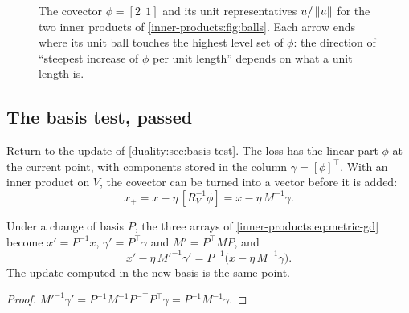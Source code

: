 \begin{notechapter}
\begin{figure}[ht]
\centering
{}
\caption{The covector $\phi = [2\ \ 1]$ and its unit representatives
$u/\left\|u\right\|$ for the two inner products of \cref{inner-products:fig:balls}.
Each arrow ends where its unit ball touches the highest level set of
$\phi$: the direction of ``steepest increase of $\phi$ per unit length''
depends on what a unit length is.}
\label{inner-products:fig:riesz}
\end{figure}

\subsection{The basis test, passed}

Return to the update of \cref{duality:sec:basis-test}. The loss has the
linear part $\phi$ at the current point, with components stored in the
column $\gamma = [\phi]^\top$. With an inner product on $V$, the covector
can be turned into a vector before it is added:
\begin{equation}\label{inner-products:eq:metric-gd}
  x_+ = x - \eta\,[R_V^{-1}\phi] = x - \eta\,M^{-1}\gamma .
\end{equation}

\begin{proposition}
\label{inner-products:prop:basis-test}
Under a change of basis $P$, the three arrays of
\eqref{inner-products:eq:metric-gd} become $x' = P^{-1}x$,
$\gamma' = P^\top\gamma$ and $M' = P^\top MP$, and
\[
  x' - \eta\,M'^{-1}\gamma' = P^{-1}\bigl(x - \eta\,M^{-1}\gamma\bigr) .
\]
The update computed in the new basis is the same point.
\end{proposition}

\begin{proof}
$M'^{-1}\gamma' = P^{-1}M^{-1}P^{-\top}P^\top\gamma = P^{-1}M^{-1}\gamma$.
\end{proof}


\end{notechapter}
